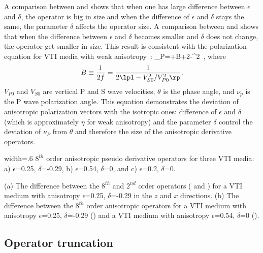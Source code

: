 A comparison between 
and  shows that when one has large
difference between $\epsilon$ and $\delta$, the operator is big in
size and when the difference of $\epsilon$ and $\delta$ stays the
same, the parameter $\delta$ affects the operator size.  A comparison
between  and 
shows that when the difference between $\epsilon$ and $\delta$ becomes
smaller and $\delta$ does not change, the operator get smaller in
size. This result is consistent with the polarization equation for VTI
media with weak anisotropy~\cite[]{Tsvankin}:
\beq
\nu_P=\theta+B\lb\delta+2\lp \epsilon-\delta \rp\sin^2\theta\rb{}\theta \, ,
\eeq
where
\[ B\equiv \frac{1}{2f}=\frac{1}{2\lp1-V_{S0}^2/V_{P0}^2 \rp}.  \]
$V_{P0}$ and $V_{S0}$ are vertical P and S wave velocities, $\theta$
is the phase angle, and $\nu_p$ is the P wave polarization angle. This
equation demonstrates the deviation of anisotropic polarization
vectors with the isotropic ones: difference of $\epsilon$ and $\delta$
(which is approximately $\eta$ for weak anisotropy) and the parameter
$\delta$ control the deviation of $\nu_P$ from $\theta$ and therefore
the size of the anisotropic derivative operators. 

 
{width=.6\textwidth}
{$8^{th}$ order anisotropic pseudo derivative operators for three VTI
  media: a) $\epsilon$=0.25, $\delta$=-0.29, b) $\epsilon$=0.54,
  $\delta$=0, and c) $\epsilon$=0.2, $\delta$=0.}

{(a) The difference between the $8^{th}$ and $2^{nd}$ order operators
( and ) for a VTI
medium with anisotropy $\epsilon$=0.25, $\delta$=-0.29 in the $z$ and
$x$ directions.  (b) The difference between the $8^{th}$ order
anisotropic operators for a VTI medium with anisotropy
$\epsilon$=0.25, $\delta$=-0.29 () and a
VTI medium with anisotropy $\epsilon$=0.54, $\delta$=0
().  }



\subsection{Operator truncation}

